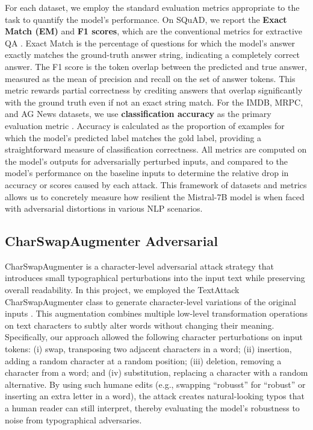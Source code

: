 \documentclass[conference]{IEEEtran}
\begin{document}
For each dataset, we employ the standard evaluation metrics appropriate to the task to quantify the model’s performance. On SQuAD, we report the \textbf{Exact Match (EM)} and \textbf{F1 scores}, which are the conventional metrics for extractive QA \cite{rajpurkar2016}. Exact Match is the percentage of questions for which the model’s answer exactly matches the ground-truth answer string, indicating a completely correct answer. The F1 score is the token overlap between the predicted and true answer, measured as the mean of precision and recall on the set of answer tokens. This metric rewards partial correctness by crediting answers that overlap significantly with the ground truth even if not an exact string match. For the IMDB, MRPC, and AG News datasets, we use \textbf{classification accuracy} as the primary evaluation metric \cite{yang2024}. Accuracy is calculated as the proportion of examples for which the model’s predicted label matches the gold label, providing a straightforward measure of classification correctness. All metrics are computed on the model’s outputs for adversarially perturbed inputs, and compared to the model’s performance on the baseline inputs to determine the relative drop in accuracy or scores caused by each attack. This framework of datasets and metrics allows us to concretely measure how resilient the Mistral-7B model is when faced with adversarial distortions in various NLP scenarios.

\subsection{CharSwapAugmenter Adversarial}

CharSwapAugmenter is a character-level adversarial attack strategy that introduces small typographical perturbations into the input text while preserving overall readability. In this project, we employed the TextAttack CharSwapAugmenter class to generate character-level variations of the original inputs \cite{textattack2020framework}. This augmentation combines multiple low-level transformation operations on text characters to subtly alter words without changing their meaning. Specifically, our approach allowed the following character perturbations on input tokens: (i) swap, transposing two adjacent characters in a word; (ii) insertion, adding a random character at a random position; (iii) deletion, removing a character from a word; and (iv) substitution, replacing a character with a random alternative. By using such humane edits (e.g., swapping “robusst” for “robust” or inserting an extra letter in a word), the attack creates natural-looking typos that a human reader can still interpret, thereby evaluating the model’s robustness to noise from typographical adversaries.
\end{document}
